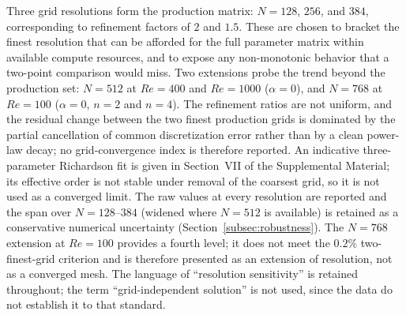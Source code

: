 Three grid resolutions form the production matrix: $N=128$, $256$, and $384$, corresponding to refinement factors of $2$ and $1.5$. These are chosen to bracket the finest resolution that can be afforded for the full parameter matrix within available compute resources, and to expose any non-monotonic behavior that a two-point comparison would miss. Two extensions probe the trend beyond the production set: $N=512$ at $Re=400$ and $Re=1000$ ($\alpha=0$), and $N=768$ at $Re=100$ ($\alpha=0$, $n=2$ and $n=4$). The refinement ratios are not uniform, and the residual change between the two finest production grids is dominated by the partial cancellation of common discretization error rather than by a clean power-law decay; no grid-convergence index is therefore reported. An indicative three-parameter Richardson fit is given in Section~VII of the Supplemental Material; its effective order is not stable under removal of the coarsest grid, so it is not used as a converged limit. The raw values at every resolution are reported and the span over $N=128$--$384$ (widened where $N=512$ is available) is retained as a conservative numerical uncertainty (Section~\ref{subsec:robustness}). The $N=768$ extension at $Re=100$ provides a fourth level; it does not meet the $0.2\%$ two-finest-grid criterion and is therefore presented as an extension of resolution, not as a converged mesh. The language of ``resolution sensitivity'' is retained throughout; the term ``grid-independent solution'' is not used, since the data do not establish it to that standard.
